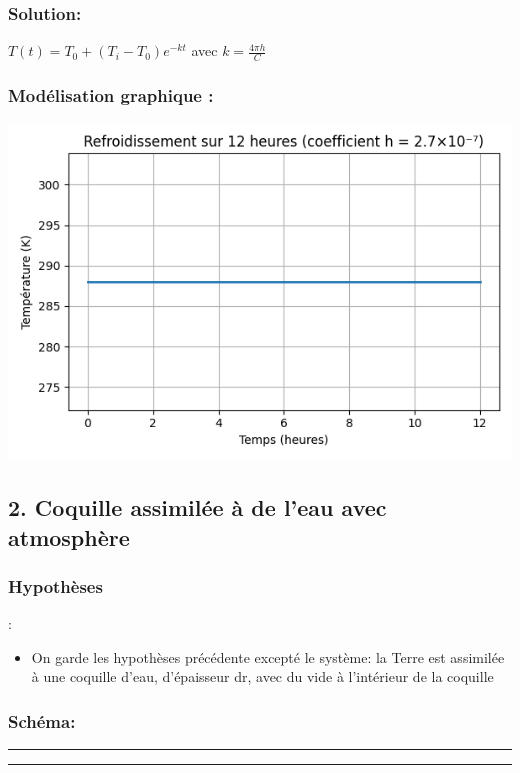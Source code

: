 \documentclass[a4paper,12pt]{article}
\begin{document}
\vspace{0.5cm}

\subsubsection*{Solution:} 
$T(t) = T_0 + (T_i - T_0)e^{-kt}$ \quad avec $k = \frac{4\pi h}{C}$
\\
\bigskip
\subsubsection*{Modélisation graphique :} 
\begin{center}
  \includegraphics[width=0.8\linewidth]{../modele2/figures/modele2.png}
\end{center}
    

\subsection*{2. Coquille assimilée à de l'eau avec atmosphère }
\subsubsection*{Hypothèses}:
\begin{itemize}
    \item On garde les hypothèses précédente excepté le système: la Terre est assimilée à une coquille d'eau, d'épaisseur dr, avec du vide à l'intérieur de la coquille \end{itemize}

\subsubsection*{Schéma:} 
\noindent\textcolor{gray}{\rule{\linewidth}{0.4pt}}

    
\begin{center}
  
\end{center}
\noindent\textcolor{gray}{\rule{\linewidth}{0.4pt}}
\end{document}
